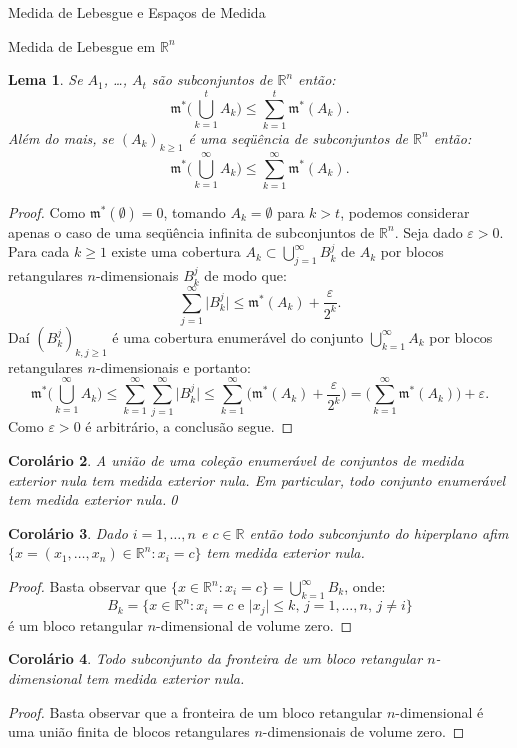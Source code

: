 \documentclass[oneside,final,11pt]{amsbook}
\newcommand{\R}{\mathds R}
\newcommand{\leb}{\mathfrak m}
\theoremstyle{remark}\newtheorem{exercise}{Exercício}[chapter]
\theoremstyle{remark}\newtheorem{*exercise}[exercise]{\hbox to 0pt{\hskip 0pt minus 1fil*}Exercício}
\theoremstyle{definition}\newtheorem{exdefin}{Definição}[chapter]
\theoremstyle{plain}\newtheorem{teo}{Teorema}[section]
\theoremstyle{plain}\newtheorem{lem}[teo]{Lema}
\theoremstyle{plain}\newtheorem{prop}[teo]{Proposição}
\theoremstyle{plain}\newtheorem{cor}[teo]{Corolário}
\theoremstyle{definition}\newtheorem{defin}[teo]{Definição}
\theoremstyle{remark}\newtheorem{rem}[teo]{Observação}
\theoremstyle{definition}\newtheorem{notation}[teo]{Notação}
\theoremstyle{definition}\newtheorem{convention}[teo]{Convenção}
\theoremstyle{definition}\newtheorem{example}[teo]{Exemplo}
\numberwithin{section}{chapter}
\numberwithin{equation}{section}
\begin{document}
\begin{chapter}{Medida de Lebesgue e Espaços de Medida}
\begin{section}[Medida de Lebesgue em $\R^n$]{Medida de Lebesgue em ${\R^n}$}
\begin{lem}\label{thm:sigmasubad}
Se $A_1$, \dots, $A_t$ são subconjuntos de $\R^n$ então:
\[\leb^*\Big(\bigcup_{k=1}^tA_k\Big)\le\sum_{k=1}^t\leb^*(A_k).\]
Além do mais, se $(A_k)_{k\ge1}$ é uma seqüência de subconjuntos de $\R^n$ então:
\[\leb^*\Big(\bigcup_{k=1}^\infty A_k\Big)\le\sum_{k=1}^\infty\leb^*(A_k).\]
\end{lem}
\begin{proof}
Como $\leb^*(\emptyset)=0$, tomando $A_k=\emptyset$ para $k>t$, podemos considerar apenas
o caso de uma seqüência infinita de subconjuntos de $\R^n$.
Seja dado $\varepsilon>0$. Para cada $k\ge1$ existe uma cobertura $A_k\subset\bigcup_{j=1}^\infty B_k^j$
de $A_k$ por blocos retangulares $n$-dimensionais $B_k^j$ de modo que:
\[\sum_{j=1}^\infty\vert B_k^j\vert\le\leb^*(A_k)+\frac\varepsilon{2^k}.\]
Daí $(B_k^j)_{k,j\ge1}$ é uma cobertura enumerável do conjunto $\bigcup_{k=1}^\infty A_k$ por blocos retangulares $n$-dimensionais
e portanto:
\[\leb^*\Big(\bigcup_{k=1}^\infty A_k\Big)\le\sum_{k=1}^\infty\sum_{j=1}^\infty\vert B_k^j\vert\le
\sum_{k=1}^\infty\Big(\leb^*(A_k)+\frac\varepsilon{2^k}\Big)=\Big(\sum_{k=1}^\infty\leb^*(A_k)\Big)+\varepsilon.\]
Como $\varepsilon>0$ é arbitrário, a conclusão segue.
\end{proof}

\begin{cor}\label{thm:uniaonula}
A união de uma coleção enumerável de conjuntos de medida exterior nula tem medida exterior nula.
Em particular, todo conjunto enumerável tem medida exterior nula.\qed
\end{cor}

\begin{cor}\label{thm:hiperplanonula}
Dado $i=1,\ldots,n$ e $c\in\R$ então todo subconjunto do hiperplano afim $\big\{x=(x_1,\ldots,x_n)\in\R^n:x_i=c\big\}$
tem medida exterior nula.
\end{cor}
\begin{proof}
Basta observar que $\big\{x\in\R^n:x_i=c\big\}=\bigcup_{k=1}^\infty B_k$, onde:
\[B_k=\big\{x\in\R^n:\text{$x_i=c$ e $\vert x_j\vert\le k$, $j=1,\ldots,n$, $j\ne i$}\big\}\]
é um bloco retangular $n$-dimensional de volume zero.
\end{proof}

\begin{cor}\label{thm:frontbloconula}
Todo subconjunto da fronteira de um bloco retangular $n$-dimensional tem medida exterior nula.
\end{cor}
\begin{proof}
Basta observar que a fronteira de um bloco retangular $n$-dimensional é uma união finita de blocos retangulares $n$-dimensionais
de volume zero.
\end{proof}


\end{section}
\end{chapter}
\end{document}
